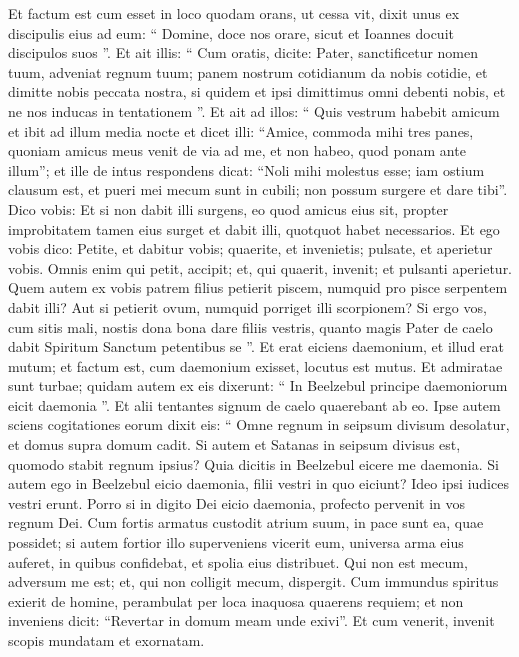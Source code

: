 \begin{biblechapter}
\begin{biblechapter}
\begin{biblechapter}
\begin{biblechapter}
\begin{biblechapter}
\begin{biblechapter}
\begin{biblechapter}
\begin{biblechapter}
\begin{biblechapter}
\begin{biblechapter}
\begin{biblechapter}
\verse Et factum est cum esset in loco quodam orans, ut cessa vit, dixit unus ex discipulis eius ad eum: “ Domine, doce nos orare, sicut et Ioannes docuit discipulos suos ”. 
\verse Et ait illis: “ Cum oratis, dicite:
 Pater, sanctificetur nomen tuum,
 adveniat regnum tuum;
 \verse panem nostrum cotidianum da nobis cotidie,
 \verse et dimitte nobis peccata nostra,
 si quidem et ipsi dimittimus omni debenti nobis,
 et ne nos inducas in tentationem ”.
 \verse Et ait ad illos: “ Quis vestrum habebit amicum et ibit ad illum media nocte et dicet illi: “Amice, commoda mihi tres panes, 
\verse quoniam amicus meus venit de via ad me, et non habeo, quod ponam ante illum”; 
\verse et ille de intus respondens dicat: “Noli mihi molestus esse; iam ostium clausum est, et pueri mei mecum sunt in cubili; non possum surgere et dare tibi”. 
\verse Dico vobis: Et si non dabit illi surgens, eo quod amicus eius sit, propter improbitatem tamen eius surget et dabit illi, quotquot habet necessarios.
 \verse Et ego vobis dico: Petite, et dabitur vobis; quaerite, et invenietis; pulsate, et aperietur vobis. 
\verse Omnis enim qui petit, accipit; et, qui quaerit, invenit; et pulsanti aperietur. 
\verse Quem autem ex vobis patrem filius petierit piscem, numquid pro pisce serpentem dabit illi? 
\verse Aut si petierit ovum, numquid porriget illi scorpionem? 
\verse Si ergo vos, cum sitis mali, nostis dona bona dare filiis vestris, quanto magis Pater de caelo dabit Spiritum Sanctum petentibus se ”.
 \verse Et erat eiciens daemonium, et illud erat mutum; et factum est, cum daemonium exisset, locutus est mutus. Et admiratae sunt turbae; 
\verse quidam autem ex eis dixerunt: “ In Beelzebul principe daemoniorum eicit daemonia ”. 
\verse Et alii tentantes signum de caelo quaerebant ab eo. 
\verse Ipse autem sciens cogitationes eorum dixit eis: “ Omne regnum in seipsum divisum desolatur, et domus supra domum cadit. 
\verse Si autem et Satanas in seipsum divisus est, quomodo stabit regnum ipsius? Quia dicitis in Beelzebul eicere me daemonia. 
 \verse Si autem ego in Beelzebul eicio daemonia, filii vestri in quo eiciunt? Ideo ipsi iudices vestri erunt. 
\verse Porro si in digito Dei eicio daemonia, profecto pervenit in vos regnum Dei.
 \verse Cum fortis armatus custodit atrium suum, in pace sunt ea, quae possidet; 
 \verse si autem fortior illo superveniens vicerit eum, universa arma eius auferet, in quibus confidebat, et spolia eius distribuet.
 \verse Qui non est mecum, adversum me est; et, qui non colligit mecum, dispergit.
 \verse Cum immundus spiritus exierit de homine, perambulat per loca inaquosa quaerens requiem; et non inveniens dicit: “Revertar in domum meam unde exivi”. \verse Et cum venerit, invenit scopis mundatam et exornatam. 

\end{biblechapter}
\end{biblechapter}
\end{biblechapter}
\end{biblechapter}
\end{biblechapter}
\end{biblechapter}
\end{biblechapter}
\end{biblechapter}
\end{biblechapter}
\end{biblechapter}
\end{biblechapter}
